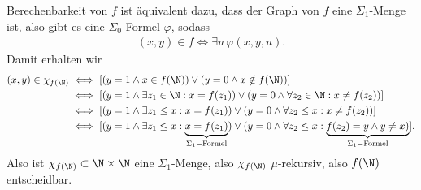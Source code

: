 \begin{solution}
\begin{enumerate}[label = Fall \arabic*:]
			Berechenbarkeit von $f$ ist äquivalent dazu, dass der Graph von $f$ eine
			$\Sigma_1$-Menge ist, also gibt es eine $\Sigma_0$-Formel $\varphi$, sodass
			\begin{align*}
				(x,y) \in f \iff \exists u\, \varphi(x,y,u).
			\end{align*}
			Damit erhalten wir
			\begin{align*}
				(x,y) \in \chi_{f(\N)} &\iff [(y = 1 \land x \in f(\N))
				\lor (y = 0 \land x \notin f(\N))] \\
				&\iff [(y = 1 \land \exists z_1 \in \N: x = f(z_1))
				\lor (y = 0 \land \forall z_2 \in \N: x \neq f(z_2))] \\
				&\iff [(y = 1 \land \exists z_1 \leq x: x = f(z_1))
				\lor (y = 0 \land \forall z_2 \leq x: x \neq f(z_2))] \\
				&\iff [(y = 1 \land \exists z_1 \leq x: \underbrace{x = f(z_1)}_{\Sigma_1-\text{Formel}})
				\lor (y = 0 \land \forall z_2 \leq x: \underbrace{f(z_2) = y \land y \neq x)}_{\Sigma_1-\text{Formel}}].
			\end{align*}
		Also ist $\chi_{f(\N)} \subset \N \times \N$ eine $\Sigma_1$-Menge, also
		$\chi_{f(\N)}$ $\mu$-rekursiv, also $f(\N)$ entscheidbar.
	\end{enumerate}

\end{solution}
